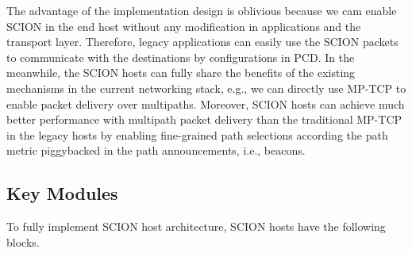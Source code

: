 The advantage of the implementation design is oblivious because we
cam enable SCION in the end host without any modification in
applications and the transport layer. Therefore, legacy applications
can easily use the SCION packets to communicate with the
destinations by configurations in PCD. In the meanwhile, the SCION
hosts can fully share the benefits of the existing mechanisms in the
current networking stack, e.g., we can directly use MP-TCP to enable
packet delivery over multipaths. Moreover, SCION hosts can achieve
much better performance with multipath packet delivery than the
traditional MP-TCP in the legacy hosts by enabling fine-grained path
selections according the path metric piggybacked in the path
announcements, i.e., beacons.

\subsection{Key Modules}

To fully implement SCION host architecture, SCION hosts have the
following blocks.

